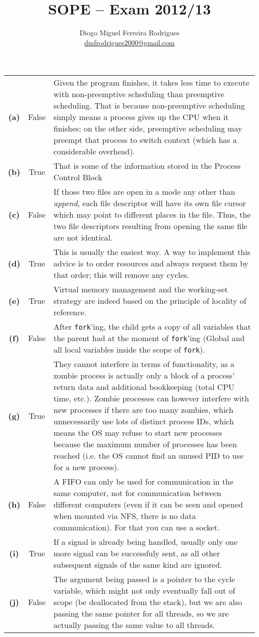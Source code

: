 \documentclass{sope}
\title{SOPE -- Exam 2012/13}
\author{Diogo Miguel Ferreira Rodrigues \\ \href{mailto:dmfrodrigues2000@gmail.com}{dmfrodrigues2000@gmail.com}}
\begin{document}
\setcounter{section}{12}
\begin{center} 
    \begin{longtable}{c | c p{132mm}}
        \textbf{(a)} & False & Given the program finishes, it takes less time to execute with non-preemptive scheduling than preemptive scheduling. That is because non-preemptive scheduling simply means a process gives up the CPU when it finishes; on the other side, preemptive scheduling may preempt that process to switch context (which has a considerable overhead). \\
        \textbf{(b)} & True & That is some of the information stored in the Process Control Block \\
        \textbf{(c)} & False & If those two files are open in a mode any other than \emph{append}, each file descriptor will have its own file cursor which may point to different places in the file. Thus, the two file descriptors resulting from opening the same file are not identical. \\
        \textbf{(d)} & True & This is usually the easiest way. A way to implement this advice is to order resources and always request them by that order; this will remove any cycles. \\
        \textbf{(e)} & True & Virtual memory management and the working-set strategy are indeed based on the principle of locality of reference. \\
        \textbf{(f)} & False & After \texttt{fork}'ing, the child gets a copy of all variables that the parent had at the moment of \texttt{fork}'ing (Global and all local variables inside the scope of \texttt{fork}). \\
        \textbf{(g)} & True & They cannot interfere in terms of functionality, as a zombie process is actually only a block of a process' return data and additional bookkeeping (total CPU time, etc.). Zombie processes can however interfere with new processes if there are too many zombies, which unnecessarily use lots of distinct process IDs, which means the OS may refuse to start new processes because the maximum number of processes has been reached (i.e. the OS cannot find an unused PID to use for a new process). \\
        \textbf{(h)} & False & A FIFO can only be used for communication in the same computer, not for communication between different computers (even if it can be seen and opened when mounted via NFS, there is no data communication). For that you can use a socket. \\
        \textbf{(i)} & True & If a signal is already being handled, usually only one more signal can be successfuly sent, as all other subsequent signals of the same kind are ignored. \\
        \textbf{(j)} & False & The argument being passed is a pointer to the cycle variable, which might not only eventually fall out of scope (be deallocated from the stack), but we are also passing the same pointer for all threads, so we are actually passing the same value to all threads.
    \end{longtable}
\end{center}
\end{document}
